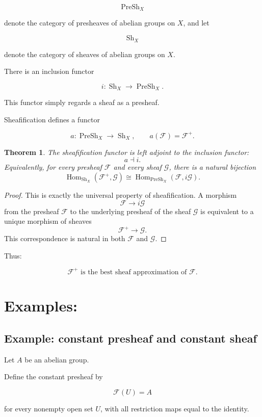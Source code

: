 \documentclass[12pt,a4paper]{article}
\newtheorem{theorem}{Theorem}[section]
\newcommand{\PreSh}{\operatorname{PreSh}}
\newcommand{\Sh}{\operatorname{Sh}}
\newcommand{\Hom}{\operatorname{Hom}}
\begin{document}
\[
\PreSh_X
\]

denote the category of presheaves of abelian groups on $X$, and let

\[
\Sh_X
\]

denote the category of sheaves of abelian groups on $X$.

There is an inclusion functor

\[
i : \Sh_X \longrightarrow \PreSh_X.
\]

This functor simply regards a sheaf as a presheaf.

Sheafification defines a functor

\[
a : \PreSh_X \longrightarrow \Sh_X,
\qquad
a(\mathcal F)=\mathcal F^+.
\]

\begin{theorem}
	The sheafification functor is left adjoint to the inclusion functor:
	\[
	a \dashv i.
	\]
	Equivalently, for every presheaf $\mathcal F$ and every sheaf $\mathcal G$,
	there is a natural bijection
	\[
	\Hom_{\Sh_X}(\mathcal F^+,\mathcal G)
	\cong
	\Hom_{\PreSh_X}(\mathcal F,i\mathcal G).
	\]
\end{theorem}

\begin{proof}
	This is exactly the universal property of sheafification.
	A morphism
	\[
	\mathcal F \longrightarrow i\mathcal G
	\]
	from the presheaf $\mathcal F$ to the underlying presheaf of the sheaf
	$\mathcal G$ is equivalent to a unique morphism of sheaves
	\[
	\mathcal F^+ \longrightarrow \mathcal G.
	\]
	This correspondence is natural in both $\mathcal F$ and $\mathcal G$.
\end{proof}

Thus:

\[
\boxed{
	\mathcal F^+ \text{ is the best sheaf approximation of } \mathcal F.
}
\]

\section{Examples: }

\subsection{Example: constant presheaf and constant sheaf}

Let $A$ be an abelian group.

Define the constant presheaf by

\[
\mathcal F(U)=A
\]

for every nonempty open set $U$, with all restriction maps equal to the identity.
\end{document}
